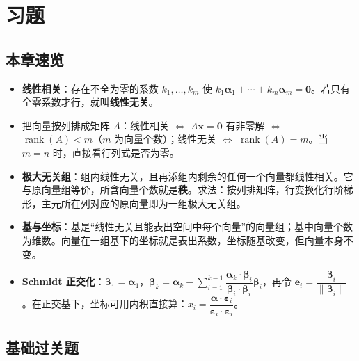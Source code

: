 \section{习题}

\subsection{本章速览}

\begin{itemize}
    \item \textbf{线性相关}：存在不全为零的系数 $k_1,\ldots,k_m$ 使 $k_1\boldsymbol{\alpha}_1+\cdots+k_m\boldsymbol{\alpha}_m=\boldsymbol{0}$。若只有全零系数才行，就叫\textbf{线性无关}。
    \item 把向量按列排成矩阵 $A$：线性相关 $\Leftrightarrow$ $A\boldsymbol{x}=\boldsymbol{0}$ 有非零解 $\Leftrightarrow$ $\operatorname{rank}(A)<m$（$m$ 为向量个数）；线性无关 $\Leftrightarrow$ $\operatorname{rank}(A)=m$。当 $m=n$ 时，直接看行列式是否为零。
    \item \textbf{极大无关组}：组内线性无关，且再添组内剩余的任何一个向量都线性相关。它与原向量组等价，所含向量个数就是\textbf{秩}。求法：按列排矩阵，行变换化行阶梯形，主元所在列对应的原向量即为一组极大无关组。
    \item \textbf{基与坐标}：基是“线性无关且能表出空间中每个向量”的向量组；基中向量个数为维数。向量在一组基下的坐标就是表出系数，坐标随基改变，但向量本身不变。
    \item \textbf{Schmidt 正交化}：$\boldsymbol{\beta}_1=\boldsymbol{\alpha}_1$，$\boldsymbol{\beta}_k=\boldsymbol{\alpha}_k-\sum_{i=1}^{k-1}\dfrac{\boldsymbol{\alpha}_k\cdot\boldsymbol{\beta}_i}{\boldsymbol{\beta}_i\cdot\boldsymbol{\beta}_i}\boldsymbol{\beta}_i$，再令 $\boldsymbol{e}_i=\dfrac{\boldsymbol{\beta}_i}{\|\boldsymbol{\beta}_i\|}$。在正交基下，坐标可用内积直接算：$x_i=\dfrac{\boldsymbol{\alpha}\cdot\boldsymbol{\varepsilon}_i}{\boldsymbol{\varepsilon}_i\cdot\boldsymbol{\varepsilon}_i}$。
\end{itemize}

\subsection{基础过关题}

